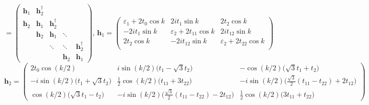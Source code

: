 \begin{equation}
[ H_{(\alpha y) (\beta y')} (k) ] = 
\begin{pmatrix}
\bm h_1 & \bm h_2^\dagger & & & \\
\bm h_2 & \bm h_1 & \bm h_2^\dagger & & \\
& \bm h_2 & \bm h_1 & \ddots & \\
& & \ddots & \ddots & \bm h_2^\dagger \\
& & & \bm h_2 & \bm h_1
\end{pmatrix}, \, 
\bm h_1 = 
\begin{pmatrix}
\varepsilon_1 + 2 t_0 \cos k & 2 i t_1 \sin k & 2 t_2 \cos k \\
-2 i t_1 \sin k & \varepsilon_2 + 2 t_{11} \cos k & 2 i t_{12} \sin k \\
2 t_2 \cos k& -2 i t_{12} \sin k & \varepsilon_2 + 2 t_{22} \cos k \\
\end{pmatrix}
\end{equation}
\begin{equation*}
\bm h_2 =
\begin{pmatrix}
2 t_0 \cos ( k / 2 ) & i \sin ( k / 2 ) \bigg( t_1 - \sqrt{3} t_2 \bigg) & - \cos (k /2 ) \bigg( \sqrt{3} t_1 + t_2 \bigg) \\
-i \sin ( k / 2 ) \bigg(t_1 + \sqrt{3} t_2 \bigg) & \frac{1}{2} \cos (k / 2) \bigg( t_{11} + 3 t_{22} \bigg) & -i \sin (k / 2) \bigg( \frac{\sqrt{3}}{2} (t_{11} -  t_{22} ) + 2 t_{12} \bigg) \\
\cos ( k / 2) \bigg( \sqrt{3} t_1 - t_2 \bigg) & -i \sin (k / 2) \bigg( \frac{\sqrt{3}}{2} ( t_{11} - t_{22} ) - 2 t_{12} \bigg) & \frac{1}{2} \cos (k / 2) \bigg( 3 t_{11	} + t_{22} \bigg)
\end{pmatrix}
\end{equation*}


